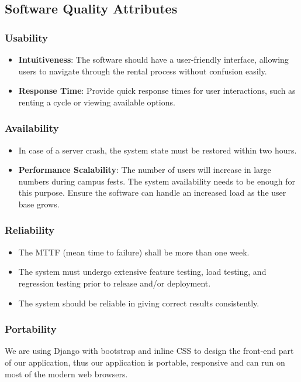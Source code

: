 \documentclass[11pt]{article}
\begin{document}
\subsection{Software Quality Attributes}
\subsubsection{Usability}
\begin{itemize}
    \item \textbf{Intuitiveness}: The software should have a user-friendly interface, allowing users to navigate through the rental process without confusion easily.
    \item \textbf{Response Time}: Provide quick response times for user interactions, such as renting a cycle or viewing available options.
\end{itemize}

\subsubsection{Availability}
\begin{itemize}
    \item In case of a server crash, the system state must be restored within two hours.
    \item \textbf{Performance Scalability}: The number of users will increase in large numbers during campus fests. The system availability needs to be enough for this purpose. Ensure the software can handle an increased load as the user base grows.
\end{itemize}
\subsubsection{Reliability}
\begin{itemize}
    \item The MTTF (mean time to failure) shall be more than one week.
    \item The system must undergo extensive feature testing, load testing, and regression testing prior to release and/or deployment.
    \item The system should be reliable in giving correct results consistently.
\end{itemize}

\subsubsection{Portability}
We are using Django with bootstrap and inline CSS to design the front-end part of our application, thus our application is portable, responsive and can run on most of the modern web browsers.
\end{document}
